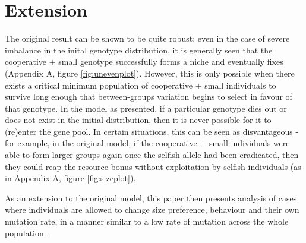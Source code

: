 \documentclass[11pt]{article}
\begin{document}
\clearpage
\section{Extension}



The original result can be shown to be quite robust: even in the case of severe imbalance in the inital genotype distribution, it is generally seen that the cooperative + small genotype successfully forms a niche and eventually fixes (Appendix A, figure \ref{fig:unevenplot}). However, this is only possible when there exists a critical minimum population of cooperative + small individuals to survive long enough that between-groups variation begins to select in favour of that genotype. In the model as presented, if a particular genotype dies out or does not exist in the initial distribution, then it is never possible for it to (re)enter the gene pool. In certain situations, this can be seen as disvantageous - for example, in the original model, if the cooperative + small individuals were able to form larger groups again once the selfish allele had been eradicated, then they could reap the resource bonus without exploitation by selfish individuals (as in Appendix A, figure \ref{fig:sizeplot}).

As an extension to the original model, this paper then presents analysis of cases where individuals are allowed to change size preference, behaviour and their own mutation rate, in a manner similar to a low rate of mutation across the whole population \citep{adaption}.
\end{document}
